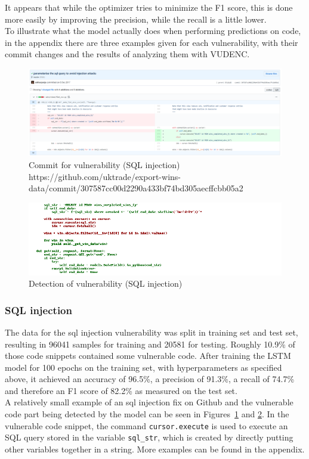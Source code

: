 \documentclass[
a4paper,
pagesize,
pdftex,
12pt,
twoside, %
BCOR=5mm, %
ngerman,
fleqn,
final,
]{scrartcl}
\begin{document}
	It appears that while the optimizer tries to minimize the F1 score, this is done more easily by improving the precision, while the recall is a little lower.\\	
	 To illustrate what the model actually does when performing predictions on code, in the appendix there are three examples given for each vulnerability, with their commit changes and the results of analyzing them with VUDENC.
	
	
	\begin{figure}[H]
		\centering
		\includegraphics[width=\linewidth]{Images/sqlB}
		\caption{Commit for vulnerability (SQL injection) \newline \scriptsize{https://github.com/uktrade/export-wins-data/commit/307587cc00d2290a433bf74bd305aecffcbb05a2}}
		\label{fig:sqlB}
	\end{figure}
	\begin{figure}[H]
		\centering
		\includegraphics[width=\linewidth]{Images/sqlBr}
		\caption{Detection of vulnerability (SQL injection)}
		\label{fig:sqlBr}
	\end{figure}
	\subsubsection{SQL injection}
	The data for the sql injection vulnerability was split in training set and test set, resulting in 96041 samples for training and 20581 for testing. Roughly 10.9\% of those code snippets contained some vulnerable code. After training the LSTM model for 100 epochs on the training set, with hyperparameters as specified above, it achieved an accuracy of 96.5\%, a precision of 91.3\%, a recall of 74.7\% and therefore an F1 score of 82.2\% as measured on the test set.\\
	A relatively small example of an sql injection fix on Github and the vulnerable code part being detected by the model can be seen in Figures~\ref{fig:sqlB} and \ref{fig:sqlBr}. In the vulnerable code snippet, the command \texttt{cursor.execute} is used to execute an SQL query stored in the variable \texttt{sql\_str}, which is created by directly putting other variables together in a string. More examples can be found in the appendix.
	
\end{document}
